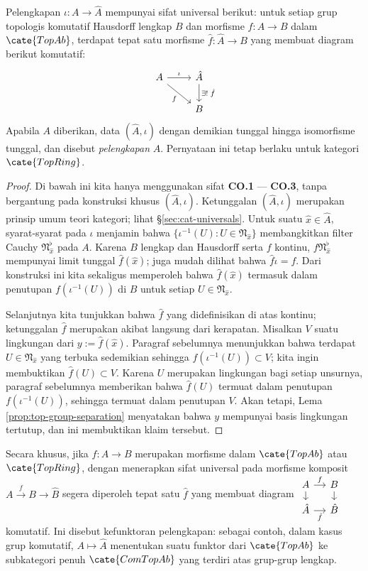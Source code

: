 \begin{proposition}\label{prop:completion-ring-characterization}
	Pelengkapan $\iota: A \to \hat{A}$ mempunyai sifat universal berikut: untuk setiap grup topologis komutatif Hausdorff lengkap $B$ dan morfisme $f: A \to B$ dalam $\cate{TopAb}$, terdapat tepat satu morfisme $\hat{f}: \hat{A} \to B$ yang membuat diagram berikut komutatif:
	\[\begin{tikzcd}
	A \arrow[r, "\iota"] \arrow[rd, "f"'] & \hat{A} \arrow[d, "\exists! \;\hat{f}"] \\
	& B
	\end{tikzcd}\]
	Apabila $A$ diberikan, data $(\hat{A}, \iota)$ dengan demikian tunggal hingga isomorfisme tunggal, dan disebut \emph{pelengkapan} $A$. Pernyataan ini tetap berlaku untuk kategori $\cate{TopRing}$.
\end{proposition}
\begin{proof}
	Di bawah ini kita hanya menggunakan sifat \textbf{CO.1} --- \textbf{CO.3}, tanpa bergantung pada konstruksi khusus $(\hat{A}, \iota)$. Ketunggalan $(\hat{A}, \iota)$ merupakan prinsip umum teori kategori; lihat \S\ref{sec:cat-universals}. Untuk suatu $\hat{x} \in \hat{A}$, syarat-syarat pada $\iota$ menjamin bahwa $\{\iota^{-1}(U): U \in \mathfrak{N}_{\hat{x}} \}$ membangkitkan filter Cauchy $\mathfrak{N}^\flat_{\hat{x}}$ pada $A$. Karena $B$ lengkap dan Hausdorff serta $f$ kontinu, $f\mathfrak{N}^\flat_{\hat{x}}$ mempunyai limit tunggal $\hat{f}(\hat{x})$; juga mudah dilihat bahwa $\hat{f}\iota = f$. Dari konstruksi ini kita sekaligus memperoleh bahwa $\hat{f}(\hat{x})$ termasuk dalam penutupan $f(\iota^{-1}(U))$ di $B$ untuk setiap $U \in \mathfrak{N}_{\hat{x}}$.

	Selanjutnya kita tunjukkan bahwa $\hat{f}$ yang didefinisikan di atas kontinu; ketunggalan $\hat{f}$ merupakan akibat langsung dari kerapatan. Misalkan $V$ suatu lingkungan dari $y := \hat{f}(\hat{x})$. Paragraf sebelumnya menunjukkan bahwa terdapat $U \in \mathfrak{N}_{\hat{x}}$ yang terbuka sedemikian sehingga $f(\iota^{-1}(U)) \subset V$; kita ingin membuktikan $\hat{f}(U) \subset V$. Karena $U$ merupakan lingkungan bagi setiap unsurnya, paragraf sebelumnya memberikan bahwa $\hat{f}(U)$ termuat dalam penutupan $f(\iota^{-1}(U))$, sehingga termuat dalam penutupan $V$.	Akan tetapi, Lema \ref{prop:top-group-separation} menyatakan bahwa $y$ mempunyai basis lingkungan tertutup, dan ini membuktikan klaim tersebut.
\end{proof}
Secara khusus, jika $f: A \to B$ merupakan morfisme dalam $\cate{TopAb}$ atau $\cate{TopRing}$, dengan menerapkan sifat universal pada morfisme komposit $A \xrightarrow{f} B \to \hat{B}$ segera diperoleh tepat satu $\hat{f}$ yang membuat diagram
$\begin{tikzcd}[row sep=small, column sep=small]
	A \arrow[r, "f"] \arrow[d] & B \arrow[d] \\
	\hat{A} \arrow[r, "\hat{f}"'] & \hat{B}
\end{tikzcd}$
komutatif. Ini disebut kefunktoran pelengkapan: sebagai contoh, dalam kasus grup komutatif, $A \mapsto \hat{A}$ menentukan suatu funktor dari $\cate{TopAb}$ ke subkategori penuh $\cate{ComTopAb}$ yang terdiri atas grup-grup lengkap.

